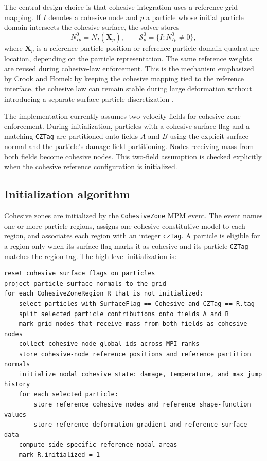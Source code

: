 The central design choice is that cohesive integration uses a reference grid mapping.  If $I$ denotes a cohesive node and $p$ a particle whose initial particle domain intersects the cohesive surface, the solver stores
\begin{equation}
  N^0_{Ip}=N_I(\mathbf{X}_p),
  \qquad
  \mathcal{S}_p^0=\{I:N^0_{Ip}\ne 0\},
\end{equation}
where $\mathbf{X}_p$ is a reference particle position or reference particle-domain quadrature location, depending on the particle representation.  The same reference weights are reused during cohesive-law enforcement.  This is the mechanism emphasized by Crook and Homel: by keeping the cohesive mapping tied to the reference interface, the cohesive law can remain stable during large deformation without introducing a separate surface-particle discretization \cite{crook2025cohesive}.

The implementation currently assumes two velocity fields for cohesive-zone enforcement.  During initialization, particles with a cohesive surface flag and a matching \texttt{CZTag} are partitioned onto fields $A$ and $B$ using the explicit surface normal and the particle's damage-field partitioning.  Nodes receiving mass from both fields become cohesive nodes.  This two-field assumption is checked explicitly when the cohesive reference configuration is initialized.

\subsection{Initialization algorithm}

Cohesive zones are initialized by the \texttt{CohesiveZone} MPM event.  The event names one or more particle regions, assigns one cohesive constitutive model to each region, and associates each region with an integer \texttt{czTag}.  A particle is eligible for a region only when its surface flag marks it as cohesive and its particle \texttt{CZTag} matches the region tag.  The high-level initialization is:

\begin{lstlisting}[caption={Cohesive-zone reference-configuration initialization.}]
reset cohesive surface flags on particles
project particle surface normals to the grid
for each CohesiveZoneRegion R that is not initialized:
    select particles with SurfaceFlag == Cohesive and CZTag == R.tag
    split selected particle contributions onto fields A and B
    mark grid nodes that receive mass from both fields as cohesive nodes
    collect cohesive-node global ids across MPI ranks
    store cohesive-node reference positions and reference partition normals
    initialize nodal cohesive state: damage, temperature, and max jump history
    for each selected particle:
        store reference cohesive nodes and reference shape-function values
        store reference deformation-gradient and reference surface data
    compute side-specific reference nodal areas
    mark R.initialized = 1
\end{lstlisting}

